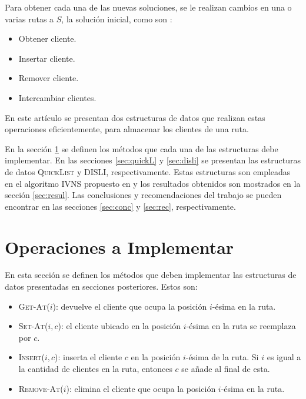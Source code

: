 \documentclass[a4paper,10pt,twocolumn]{article}
\begin{document}
  Para obtener cada una de las nuevas soluciones, se le realizan cambios en una o varias
  rutas a $ S $, la solución inicial, como son \cite{Camila, Andy}:
  \begin{itemize}
  	\item Obtener cliente.
  	\item Insertar cliente.
  	\item Remover cliente.
  	\item Intercambiar clientes.
  \end{itemize}
  
  En este artículo se presentan dos estructuras de datos que realizan estas operaciones
  eficientemente, para almacenar los clientes de una ruta. 
  
  En la sección \ref{sec:oper} se definen los métodos que cada una de las estructuras 
  debe implementar. En las secciones \ref{sec:quickL} y \ref{sec:disli} se presentan las
  estructuras de datos \textsc{QuickList} y \textsc{DISLI}, respectivamente. Estas
  estructuras son empleadas en el algoritmo IVNS propuesto en \cite{Andy} y los 
  resultados obtenidos son mostrados en la sección \ref{sec:resul}. Las conclusiones 
  y recomendaciones del trabajo se pueden encontrar en las secciones \ref{sec:conc} y
  \ref{sec:rec}, respectivamente.

\section{Operaciones a Implementar}\label{sec:oper}
  En esta sección se definen los métodos que deben implementar las estructuras de 
  datos presentadas en secciones posteriores. Estos son:
  
  \begin{itemize}
  	\item \textsc{Get-At($i$)}: devuelve el cliente que ocupa la posición $i$-ésima en 
  	la ruta.
  	
  	\item \textsc{Set-At($i, c$)}: el cliente ubicado en la posición $i$-ésima en la 
  	ruta se reemplaza por $c$.
  	
  	\item \textsc{Insert}($i, c$): inserta el cliente $c$ en la posición $i$-ésima de
  	la ruta. Si $ i $ es igual a la cantidad de clientes en la ruta, entonces $ c $ se
  	añade al final de esta.

	\item \textsc{Remove-At($i$)}: elimina el cliente que ocupa la posición $i$-ésima 
	en la ruta.
	
  \end{itemize}
  
\end{document}
